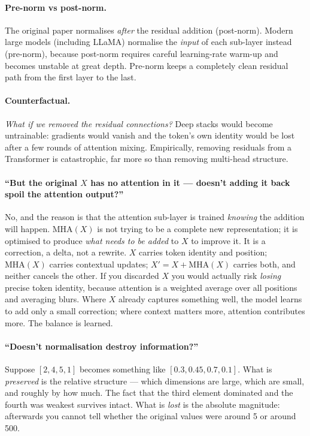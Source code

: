 \documentclass[11pt,a4paper]{article}
\begin{document}
\paragraph{Pre-norm vs post-norm.} The original paper normalises \emph{after} the residual
addition (post-norm). Modern large models (including LLaMA) normalise the \emph{input} of
each sub-layer instead (pre-norm), because post-norm requires careful learning-rate warm-up
and becomes unstable at great depth. Pre-norm keeps a completely clean residual path from
the first layer to the last.

\paragraph{Counterfactual.} \emph{What if we removed the residual connections?} Deep stacks
would become untrainable: gradients would vanish and the token's own identity would be lost
after a few rounds of attention mixing. Empirically, removing residuals from a Transformer
is catastrophic, far more so than removing multi-head structure.

\paragraph{``But the original $X$ has no attention in it --- doesn't adding it back spoil the
attention output?''} No, and the reason is that the attention sub-layer is trained
\emph{knowing} the addition will happen. $\mathrm{MHA}(X)$ is not trying to be a complete new
representation; it is optimised to produce \emph{what needs to be added} to $X$ to improve it.
It is a correction, a delta, not a rewrite. $X$ carries token identity and position;
$\mathrm{MHA}(X)$ carries contextual updates; $X' = X + \mathrm{MHA}(X)$ carries both, and
neither cancels the other. If you discarded $X$ you would actually risk \emph{losing} precise
token identity, because attention is a weighted average over all positions and averaging
blurs. Where $X$ already captures something well, the model learns to add only a small
correction; where context matters more, attention contributes more. The balance is learned.

\paragraph{``Doesn't normalisation destroy information?''} Suppose $[2,4,5,1]$ becomes
something like $[0.3, 0.45, 0.7, 0.1]$. What is \emph{preserved} is the relative structure ---
which dimensions are large, which are small, and roughly by how much. The fact that the third
element dominated and the fourth was weakest survives intact. What is \emph{lost} is the
absolute magnitude: afterwards you cannot tell whether the original values were around 5 or
around 500.
\end{document}
